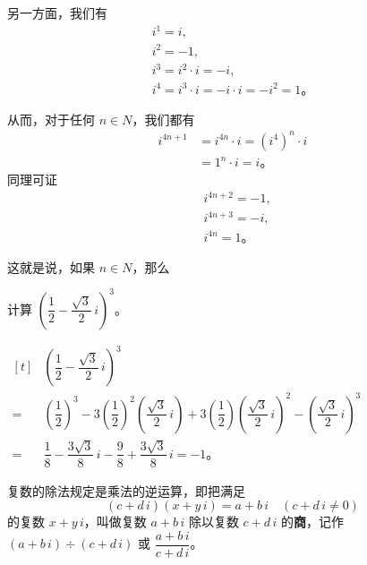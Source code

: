 另一方面，我们有
\begin{gather*}
    i^1 = i, \\
    i^2 = -1, \\
    i^3 = i^2 \cdot i = - i, \\
    i^4 = i^3 \cdot i = - i \cdot i = - i^2 = 1 \text{。}
\end{gather*}

从而，对于任何 $n \in N$，我们都有
\begin{align*}
    i^{4n+1} &= i^{4n} \cdot i = (i^4)^n \cdot i \\
        &= 1^n \cdot i = i \text{。}
\end{align*}
同理可证
\begin{align*}
    & i^{4n + 2} = -1, \\
    & i^{4n + 3} = -i, \\
    & i^{4n} = 1 \text{。}
\end{align*}

这就是说，如果 $n \in N$，那么
\begin{center}
\end{center}

\liti 计算 $\left( \dfrac{1}{2} - \dfrac{\sqrt{3}}{2}\,i \right)^3$。

\jie \quad $\begin{aligned}[t]
        & \left( \dfrac{1}{2} - \dfrac{\sqrt{3}}{2}\,i \right)^3 \\
    ={} & \left( \dfrac{1}{2} \right)^3 - 3 \left( \dfrac{1}{2} \right)^2 \left( \dfrac{\sqrt{3}}{2}\,i \right)
        + 3 \left( \dfrac{1}{2} \right) \left( \dfrac{\sqrt{3}}{2}\,i \right)^2
        - \left( \dfrac{\sqrt{3}}{2}\,i \right)^3 \\
    ={} & \dfrac{1}{8} - \dfrac{3\sqrt{3}}{8}\,i - \dfrac{9}{8} + \dfrac{3\sqrt{3}}{8}\,i = -1 \text{。}
\end{aligned}$



复数的除法规定是乘法的逆运算，即把满足
$$ (c + d\,i)(x + y\,i) = a + b\,i \quad (c + d\,i \neq 0) $$
的复数 $x + y\,i$，叫做复数 $a + b\,i$ 除以复数 $c + d\,i$ 的\textbf{商}，记作
$(a + b\,i) \div (c + d\,i)$ 或 $\dfrac{a + b\,i}{c + d\,i}$。

